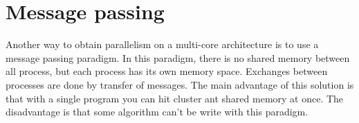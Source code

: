 \section{Message passing}
Another way to obtain parallelism on a multi-core architecture is to use a message passing paradigm.
%
In this paradigm, there is no shared memory between all process, but each process has its own memory space.
%
Exchanges between processes are done by transfer of messages.
%
The main advantage of this solution is that with a single program you can hit cluster ant shared memory at once.
%
The disadvantage is that some algorithm can't be write with this paradigm.

